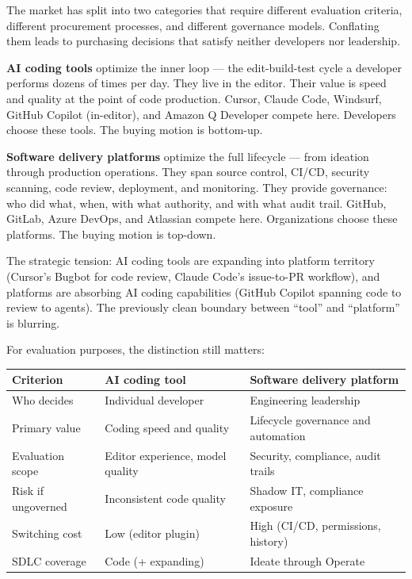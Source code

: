 \documentclass[
  a4paper,
  DIV=11,
  numbers=noendperiod]{scrreprt}
\newcounter{none} %
\begin{document}
The market has split into two categories that require different
evaluation criteria, different procurement processes, and different
governance models. Conflating them leads to purchasing decisions that
satisfy neither developers nor leadership.

\textbf{AI coding tools} optimize the inner loop --- the edit-build-test
cycle a developer performs dozens of times per day. They live in the
editor. Their value is speed and quality at the point of code
production. Cursor, Claude Code, Windsurf, GitHub Copilot (in-editor),
and Amazon Q Developer compete here. Developers choose these tools. The
buying motion is bottom-up.

\textbf{Software delivery platforms} optimize the full lifecycle ---
from ideation through production operations. They span source control,
CI/CD, security scanning, code review, deployment, and monitoring. They
provide governance: who did what, when, with what authority, and with
what audit trail. GitHub, GitLab, Azure DevOps, and Atlassian compete
here. Organizations choose these platforms. The buying motion is
top-down.

The strategic tension: AI coding tools are expanding into platform
territory (Cursor's Bugbot for code review, Claude Code's issue-to-PR
workflow), and platforms are absorbing AI coding capabilities (GitHub
Copilot spanning code to review to agents). The previously clean
boundary between ``tool'' and ``platform'' is blurring.

For evaluation purposes, the distinction still matters:

{\def\LTcaptype{none} %
\begin{longtable}[]{@{}
  >{\raggedright\arraybackslash}p{}
  >{\raggedright\arraybackslash}p{}
  >{\raggedright\arraybackslash}p{}@{}}
\toprule\noalign{}
\begin{minipage}[b]{\linewidth}\raggedright
Criterion
\end{minipage} & \begin{minipage}[b]{\linewidth}\raggedright
AI coding tool
\end{minipage} & \begin{minipage}[b]{\linewidth}\raggedright
Software delivery platform
\end{minipage} \\
\midrule\noalign{}
\endhead
\bottomrule\noalign{}
\endlastfoot
Who decides & Individual developer & Engineering leadership \\
Primary value & Coding speed and quality & Lifecycle governance and
automation \\
Evaluation scope & Editor experience, model quality & Security,
compliance, audit trails \\
Risk if ungoverned & Inconsistent code quality & Shadow IT, compliance
exposure \\
Switching cost & Low (editor plugin) & High (CI/CD, permissions,
history) \\
SDLC coverage & Code (+ expanding) & Ideate through Operate \\
\end{longtable}
}
\end{document}
